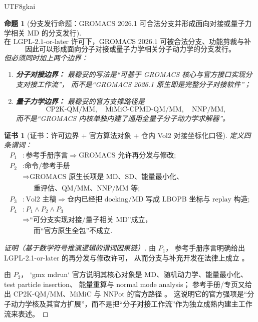 \documentclass[12pt]{article}
\newtheorem{proposition}{命题}[section]
\newtheorem{Certificate}{证书}[section]
\begin{document}
\begin{CJK*}{UTF8}{gkai}
\begin{proposition}[分支发行命题：GROMACS 2026.1 可合法分支并形成面向对接或量子力学相关 MD 的分支发行]
\label{prop:tex39-branch-boundary}
\[
  \boxed{
    \text{在 LGPL-2.1-or-later 许可下，GROMACS 2026.1 可被合法分支、功能剪裁与补充开发。}
  }
\]
\[
  \boxed{
    \text{因此可以形成面向分子对接或量子力学相关分子动力学的分支发行。}
  }
\]
但必须同时加上两个边界：
\begin{enumerate}
  \item \textbf{分子对接边界：}
  最稳妥的写法是“可基于 GROMACS 核心与官方接口实现分支对接工作流”，
  而不是“GROMACS 2026.1 原生即是完整分子对接软件”；
  \item \textbf{量子力学边界：}
  最稳妥的官方支撑路径是
  \[
    \text{CP2K-QM/MM},
    \quad
    \text{MiMiC-CPMD-QM/MM},
    \quad
    \text{NNP/MM},
  \]
  而不是“GROMACS 内核单独内建了通用全量子分子动力学求解器”。
\end{enumerate}
\end{proposition}

\begin{Certificate}[证书：许可边界 + 官方算法对象 + 仓内 Vol2 对接坐标化口径]
\label{cert:tex39-branch-boundary}
定义四条谓词：
\[
\begin{aligned}
  P_1 &: \text{参考手册序言}
  \Rightarrow
  \text{GROMACS 允许再分发与修改};\\
  P_2 &: \text{命令/参考手册}\\
      &\Rightarrow
      \text{GROMACS 原生长项是 MD、SD、能量最小化、}\\
      &\phantom{\Rightarrow}\text{重评估、QM/MM、NNP/MM 等};\\
  P_3 &: \text{Vol2 主稿}
  \Rightarrow
  \text{仓内已经把 docking/MD 写成 LBOPB 坐标与 replay 构造};\\
  P_4 &: P_1\wedge P_2\wedge P_3\\
      &\Rightarrow
      \text{“可分支实现对接/量子相关 MD”成立，}\\
      &\phantom{\Rightarrow}\text{而“官方原生全包”不成立}.
\end{aligned}
\]
\end{Certificate}

\begin{proof}[证明（基于数学符号推演逻辑的谓词因果链）]
由 $P_1$，
参考手册序言明确给出 LGPL-2.1-or-later 的再分发与修改许可，
从而分支与补充开发在法律上成立
\cite{Gromacs2026Preface}。

由 $P_2$，
`gmx mdrun` 官方说明其核心对象是 MD、随机动力学、能量最小化、test particle insertion、
能量重算与 normal mode analysis；
参考手册/专页又给出 CP2K-QM/MM、MiMiC 与 NNPot 的官方路径
\cite{Gromacs2026Mdrun,Gromacs2026CP2K,Gromacs2026MiMiC,Gromacs2026NNPot}。
这说明它的官方强项是“分子动力学核及其官方扩展”，而不是把“分子对接工作流”作为独立成熟内建主工作流来表述。


\end{proof}
\end{CJK*}
\end{document}
